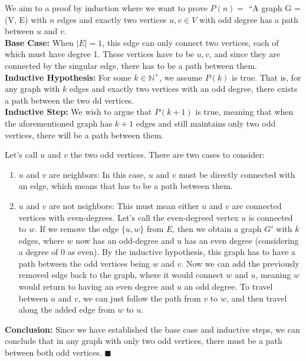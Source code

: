 \documentclass{article}
\begin{document}
We aim to a proof by induction where we want to prove $P(n) =$ “A graph G = (V, E) with $n$ edges and exactly two vertices $u, v \in V$ with odd degree has a path between $u$ and $v$. \\ 

\textbf{Base Case:} When $|E| = 1$, this edge can only connect two vertices, each of which must have degree 1. These vertices have to be $u, v$, and since they are connected by the singular edge, there has to be a path between them. \\

\textbf{Inductive Hypothesis:} For some $k \in \mathbb{N^{+}}$, we assume $P(k)$ is true. That is, for any graph with $k$ edges and exactly two vertices with an odd degree, there exists a path between the two dd vertices. \\

\textbf{Inductive Step:} We wish to argue that $P(k+1)$ is true, meaning that when the aforementioned graph has $k+1$ edges and still maintains only two odd vertices, there will be a path between them. 

Let's call $u$ and $v$ the two odd vertices. There are two cases to consider: 

\begin{enumerate}

\item $u$ and $v$ are neighbors: In this case, $u$ and $v$ must be directly connected with an edge, which means that has to be a path between them. 

\item $u$ and $v$ are not neighbors: This must mean either $u$ and $v$ are connected vertices with even-degrees. Let's call the even-degreed vertex $u$ is connected to $w$. If we remove the edge $\{u, w\}$ from $E$, then we obtain a graph $G'$ with $k$ edges, where $w$ now has an odd-degree and u has an even degree (considering a degree of $0$ as even). By the inductive hypothesis, this graph has to have a path between the odd vertices being $w$ and $v$. Now we can add the previously removed edge back to the graph, where it would connect $w$ and $u$, meaning $w$ would return to having an even degree and $u$ an odd degree. To travel between $u$ and $v$, we can just follow the path from $v$ to $w$, and then travel along the added edge from $w$ to $u$.
\end{enumerate}

\textbf{Conclusion:} Since we have established the base case and inductive steps, we can conclude that in any graph with only two odd vertices, there must be a path between both odd vertices. $\blacksquare$
\end{document}
